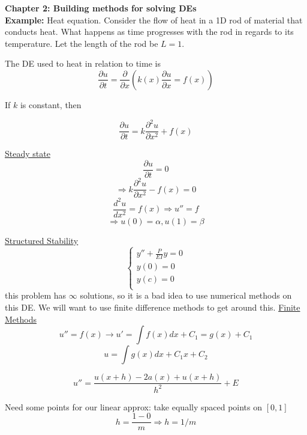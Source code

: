 \documentclass[10pt]{article}
\begin{document}
\textbf{Chapter 2: Building methods for solving DEs}\\

\textbf{Example:} Heat equation. Consider the flow of heat in a 1D rod of material that conducts heat. What happens as time progresses with the rod in regards to its temperature. Let the length of the rod be $L = 1$.

The DE used to heat in relation to time is
\[\frac{\partial u}{\partial t} = \frac{\partial}{\partial x}(k(x) \frac{\partial u}{\partial x} = f(x)) \]

If $k$ is constant, then

\[\frac{\partial u}{\partial t} = k \frac{\partial^2 u}{\partial x^2} + f(x)\]

\underline{Steady state}
\[\frac{\partial u}{\partial t} = 0\]
\[\Rightarrow k\frac{\partial^2 u}{\partial x^2} - f(x) = 0\]
\[\frac{d^2 u}{dx^2} = f(x) \Rightarrow u'' = f\]
\[\Rightarrow u(0) = \alpha, u(1) = \beta\]

\underline{Structured Stability}
\[\begin{cases}
    y'' + \frac{P}{EI} y = 0\\
    y(0) = 0\\
    y(c) = 0\\
\end{cases}
\]
this problem has $\infty$ solutions, so it is a bad idea to use numerical methods on this DE. We will want to use finite difference methods to get around this.
\newpage
\underline{Finite Methods}
\[u'' = f(x) \rightarrow u' = \int f(x)dx + C_1 = g(x) + C_1\]
\[u = \int g(x) dx + C_1x + C_2\]

\[u'' = \frac{u(x + h) -2a(x) + u(x + h)}{h^2} + E\]

Need some points for our linear approx: take equally spaced points on $[0, 1]$
\[h = \frac{1-0}{m} \Rightarrow h = 1/m\]
\noindent \underline{\hspace{3in}}\\
\end{document}
